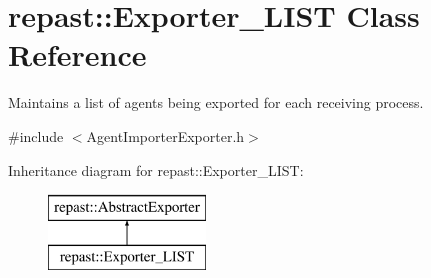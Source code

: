 \hypertarget{classrepast_1_1_exporter___l_i_s_t}{\section{repast\-:\-:Exporter\-\_\-\-L\-I\-S\-T Class Reference}
\label{classrepast_1_1_exporter___l_i_s_t}
}


Maintains a list of agents being exported for each receiving process.  




{\ttfamily \#include $<$Agent\-Importer\-Exporter.\-h$>$}

Inheritance diagram for repast\-:\-:Exporter\-\_\-\-L\-I\-S\-T\-:\begin{figure}[H]
\begin{center}
\leavevmode
\includegraphics[height=2.000000cm]{classrepast_1_1_exporter___l_i_s_t}
\end{center}
\end{figure}
